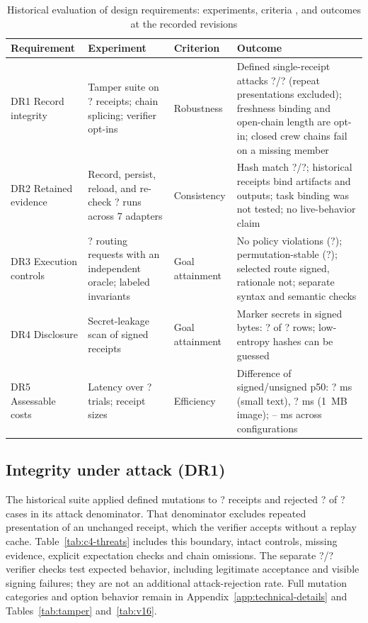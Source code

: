 \documentclass[11pt]{article}
\newcommand{\RoutePermSame}{?}
\newcommand{\RouteViolations}{?}
\newcommand{\RouteRequests}{?}
\newcommand{\TamperBase}{?}
\newcommand{\TamperAttacks}{?}
\newcommand{\TamperRejected}{?}
\newcommand{\ReplayRuns}{?}
\newcommand{\ReplayHash}{?}
\newcommand{\LeakRows}{?}
\newcommand{\LeakHits}{?}
\newcommand{\OverheadTrials}{?}
\newcommand{\SignDeltaSmallMs}{?}
\newcommand{\SignDeltaImageMs}{?}
\newcommand{\VerifierChecks}{?}
\newcommand{\VerifierChecksPassed}{?}
\begin{document}
\begin{table}[!htbp]
\centering
\caption{Historical evaluation of design requirements: experiments, criteria \citep{prat2015}, and outcomes at the recorded revisions}
\label{tab:eval-map}
\footnotesize
\begin{tabularx}{\textwidth}{@{}>{\raggedright\arraybackslash}p{2.2cm}>{\raggedright\arraybackslash}p{3.4cm}>{\raggedright\arraybackslash}p{2.2cm}X@{}}
\toprule
Requirement & Experiment & Criterion & Outcome \\
\midrule
DR1 Record integrity & Tamper suite on \TamperBase{} receipts; chain splicing; verifier opt-ins & Robustness & Defined single-receipt attacks \TamperRejected{}/\TamperAttacks{} (repeat presentations excluded); freshness binding and open-chain length are opt-in; closed crew chains fail on a missing member \\
DR2 Retained evidence & Record, persist, reload, and re-check \ReplayRuns{} runs across 7 adapters & Consistency & Hash match \ReplayHash{}/\ReplayRuns{}; historical receipts bind artifacts and outputs; task binding was not tested; no live-behavior claim \\
DR3 Execution controls & \RouteRequests{} routing requests with an independent oracle; labeled invariants & Goal attainment & No policy violations (\RouteViolations{}); permutation-stable (\RoutePermSame{}); selected route signed, rationale not; separate syntax and semantic checks \\
DR4 Disclosure & Secret-leakage scan of signed receipts & Goal attainment & Marker secrets in signed bytes: \LeakHits{} of \LeakRows{} rows; low-entropy hashes can be guessed \\
DR5 Assessable costs & Latency over \OverheadTrials{} trials; receipt sizes & Efficiency & Difference of signed/unsigned p50: \SignDeltaSmallMs{} ms (small text), \SignDeltaImageMs{} ms (1~MB image); \CfourSignDeltaMinMs{}--\CfourSignDeltaMaxMs{} ms across \CfourSignDeltaConfigs{} configurations \\
\bottomrule
\end{tabularx}
\end{table}

\subsection{Integrity under attack (DR1)}

The historical suite applied defined mutations to \TamperBase{} receipts and rejected \TamperRejected{} of \TamperAttacks{} cases in its attack denominator. That denominator excludes repeated presentation of an unchanged receipt, which the verifier accepts without a replay cache. Table~\ref{tab:c4-threats} includes this boundary, intact controls, missing evidence, explicit expectation checks and chain omissions. The separate \VerifierChecksPassed{}/\VerifierChecks{} verifier checks test expected behavior, including legitimate acceptance and visible signing failures; they are not an additional attack-rejection rate. Full mutation categories and option behavior remain in Appendix~\ref{app:technical-details} and Tables~\ref{tab:tamper} and~\ref{tab:v16}.
\end{document}
